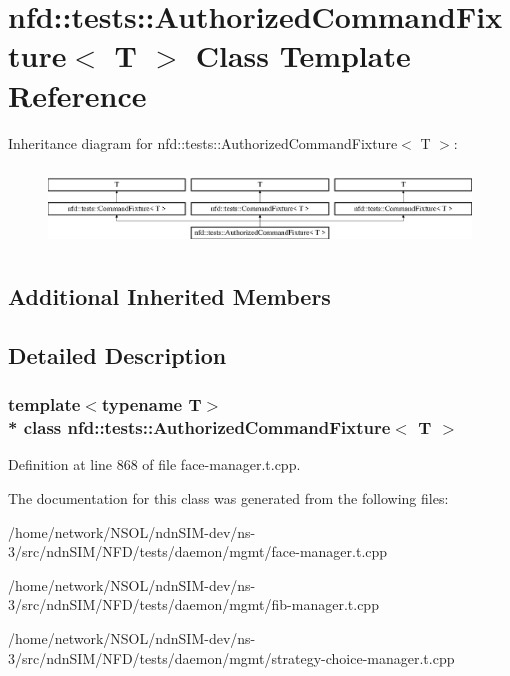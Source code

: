 \hypertarget{classnfd_1_1tests_1_1AuthorizedCommandFixture}{}\section{nfd\+:\+:tests\+:\+:Authorized\+Command\+Fixture$<$ T $>$ Class Template Reference}
\label{classnfd_1_1tests_1_1AuthorizedCommandFixture}
Inheritance diagram for nfd\+:\+:tests\+:\+:Authorized\+Command\+Fixture$<$ T $>$\+:\begin{figure}[H]
\begin{center}
\leavevmode
\includegraphics[height=2.145594cm]{classnfd_1_1tests_1_1AuthorizedCommandFixture}
\end{center}
\end{figure}
\subsection*{Additional Inherited Members}


\subsection{Detailed Description}
\subsubsection*{template$<$typename T$>$\\*
class nfd\+::tests\+::\+Authorized\+Command\+Fixture$<$ T $>$}



Definition at line 868 of file face-\/manager.\+t.\+cpp.



The documentation for this class was generated from the following files\+:\begin{DoxyCompactItemize}
\item 
/home/network/\+N\+S\+O\+L/ndn\+S\+I\+M-\/dev/ns-\/3/src/ndn\+S\+I\+M/\+N\+F\+D/tests/daemon/mgmt/face-\/manager.\+t.\+cpp\item 
/home/network/\+N\+S\+O\+L/ndn\+S\+I\+M-\/dev/ns-\/3/src/ndn\+S\+I\+M/\+N\+F\+D/tests/daemon/mgmt/fib-\/manager.\+t.\+cpp\item 
/home/network/\+N\+S\+O\+L/ndn\+S\+I\+M-\/dev/ns-\/3/src/ndn\+S\+I\+M/\+N\+F\+D/tests/daemon/mgmt/strategy-\/choice-\/manager.\+t.\+cpp\end{DoxyCompactItemize}
